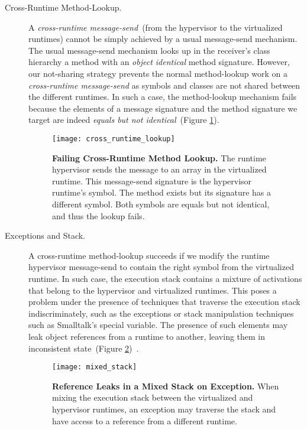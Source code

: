 \begin{description}

\item[Cross-Runtime Method-Lookup.]A \emph{cross-runtime message-send}~(from the hypervisor to the virtualized runtimes) cannot be simply achieved by a usual message-send mechanism. The usual message-send mechanism looks up in the receiver's class hierarchy a method with an \emph{object identical} method signature. However, our not-sharing strategy prevents the normal method-lookup work on a \emph{cross-runtime message-send} as symbols and classes are not shared between the different runtimes. In such a case, the method-lookup mechanism fails because the elements of a message signature and the method signature we target are indeed \emph{equals but not identical}~(Figure \ref{fig:cross_runtime_lookup}).

\begin{figure}[ht]
\center
\texttt{[image: cross\_runtime\_lookup]}
\caption{\textbf{Failing Cross-Runtime Method Lookup.} The runtime hypervisor sends the  message to an array in the virtualized runtime. This message-send signature is the hypervisor runtime's  symbol. The  method exists but its signature has a different  symbol. Both symbols are equals but not identical, and thus the lookup fails.\label{fig:cross_runtime_lookup}}
\end{figure}

\item[Exceptions and Stack.] A cross-runtime method-lookup succeeds if we modify the runtime hypervisor message-send to contain the right symbol from the virtualized runtime. In such case, the execution stack contains a mixture of activations that belong to the hypervisor and virtualized runtimes. This poses a problem under the presence of techniques that traverse the execution stack indiscriminately, such as the exceptions or stack manipulation techniques such as Smalltalk's  special variable. The presence of such elements may leak object references from a runtime to another, leaving them in inconsistent state~(Figure \ref{fig:mixed_stack})~\cite{Mett10a}.

\begin{figure}[ht]
\center
\texttt{[image: mixed\_stack]}
\caption{\textbf{Reference Leaks in a Mixed Stack on Exception.} When mixing the execution stack between the virtualized and hypervisor runtimes, an exception may traverse the stack and have access to a reference from a different runtime.\label{fig:mixed_stack}}
\end{figure}

\end{description}

